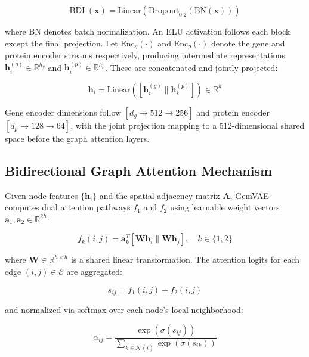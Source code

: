\documentclass[conference]{IEEEtran}
\begin{document}
\begin{equation}
    \text{BDL}(\mathbf{x}) = \text{Linear}(\text{Dropout}_{0.2}(\text{BN}(\mathbf{x})))
\end{equation}

where BN denotes batch normalization. An ELU activation \cite{b11} follows each block except the final projection. Let $\text{Enc}_g(\cdot)$ and $\text{Enc}_p(\cdot)$ denote the gene and protein encoder streams respectively, producing intermediate representations $\mathbf{h}_i^{(g)} \in \mathbb{R}^{h_g}$ and $\mathbf{h}_i^{(p)} \in \mathbb{R}^{h_p}$. These are concatenated and jointly projected:

\begin{equation}
    \mathbf{h}_i = \text{Linear}([\mathbf{h}_i^{(g)} \| \mathbf{h}_i^{(p)}]) \in \mathbb{R}^{h}
\end{equation}

Gene encoder dimensions follow $[d_g \to 512 \to 256]$ and protein encoder $[d_p \to 128 \to 64]$, with the joint projection mapping to a 512-dimensional shared space before the graph attention layers.

\subsection{Bidirectional Graph Attention Mechanism}

Given node features $\{\mathbf{h}_i\}$ and the spatial adjacency matrix $\mathbf{A}$, GemVAE computes dual attention pathways $f_1$ and $f_2$ using learnable weight vectors $\mathbf{a}_1, \mathbf{a}_2 \in \mathbb{R}^{2h}$:

\begin{equation}
    f_k(i,j) = \mathbf{a}_k^T [\mathbf{W}\mathbf{h}_i \| \mathbf{W}\mathbf{h}_j], \quad k \in \{1, 2\}
\end{equation}

where $\mathbf{W} \in \mathbb{R}^{h \times h}$ is a shared linear transformation. The attention logits for each edge $(i,j) \in \mathcal{E}$ are aggregated:

\begin{equation}
    s_{ij} = f_1(i,j) + f_2(i,j)
\end{equation}

and normalized via softmax over each node's local neighborhood:

\begin{equation}
    \alpha_{ij} = \frac{\exp(\sigma(s_{ij}))}{\sum_{k \in \mathcal{N}(i)} \exp(\sigma(s_{ik}))}
\end{equation}
\end{document}
